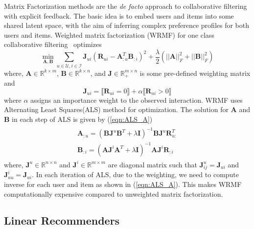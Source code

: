 \documentclass{article}
\newcommand{\indicator}[1]{\llbracket #1 \rrbracket}
\newcommand{\Real}{\mathbb{R}}
\newcommand{\R}{\mathbf{R}}
\newcommand{\A}{\mathbf{A}}
\newcommand{\B}{\mathbf{B}}
\newcommand{\I}{\mathbf{I}}
\newcommand{\J}{\mathbf{J}}
\newcommand{\numUsers}{m}
\newcommand{\numItems}{n}
\newcommand{\userSet}{\mathcal{U}}
\newcommand{\itemSet}{\mathcal{I}}
\renewcommand{\u}{u}
\renewcommand{\i}{i}
\newcommand{\ui}{\u\i}
\begin{document}
Matrix Factorization methods are the \emph{de facto} approach to collaborative filtering with explicit feedback. The basic idea is to embed users and items into some shared latent space, with the aim of inferring complex preference profiles for both users and items.
Weighted matrix factorization (WRMF) for one class collaborative filtering~\cite{Hu:2008,Pan:2009} optimizes
\begin{equation}
\label{eqn:wrmf}
\min_{ \A,\B  } \sum_{ u \in \userSet, i \in \itemSet } \J_{\ui} ( \R_{\ui} - \A_{:u}^T \B_{:i} )^2 + \frac{\lambda}{2}  ( ||\A||_F^2 + ||\B||_F^2 )
\end{equation}
where, $\A\in\Real^{k\times m}$, $\B\in\Real^{k\times n}$, and $\J \in \Real_+^{\numUsers \times \numItems}$ is some pre-defined weighting matrix  and
\begin{equation}
\label{eqn:wrmf-weight}
\J_{\ui} =  \indicator{ \R_{\ui} = 0 } + \alpha \indicator{ \R_{\ui} > 0 }
\end{equation}
where $\alpha$ assigns an importance weight to the observed interaction.
WRMF uses Alternating Least Squares(ALS) method for optimization. The solution for $\A$ and $\B$ in each step of ALS is given by (\ref{eqn:ALS_A})
\begin{align}
	\label{eqn:ALS_A}
	\begin{split}
	\A_{:u} = (\B \J^u \B^T + \lambda \I)^{-1} \B \J^u \R_{u:}^{T} \\
	\B_{:i} = (\A \J^i \A^T + \lambda \I)^{-1} \A \J^i \R_{:i}
	\end{split}
\end{align}
where, $\J^u \in \mathbb{R}^{n \times n}$ and $\J^i \in \mathbb{R}^{m \times m}$ are diagonal matrix such that $ \J^u_{ij} = \J_{ui}$ and  $\J^i_{uu} = \J_{ui}$. In each iteration of ALS, due to the weighting, we need to compute inverse for each user and item as shown in (\ref{eqn:ALS_A}). This makes WRMF computationally expensive compared to unweighted matrix factorization.

\subsection{Linear Recommenders}
\end{document}
